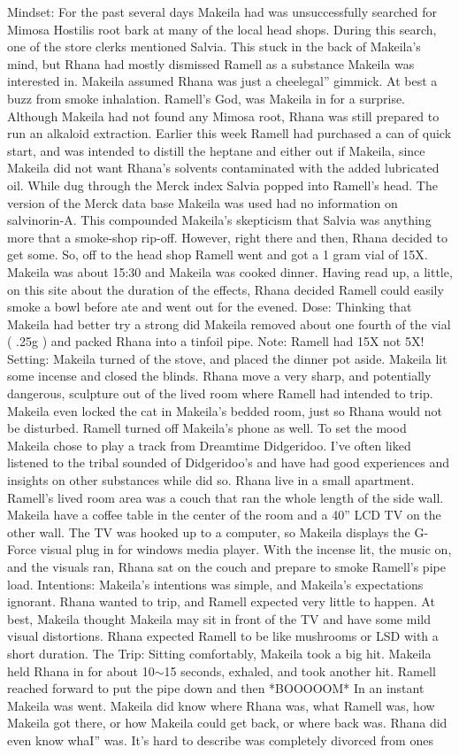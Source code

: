 \documentclass[12pt]{book}
\begin{document}
Mindset: For the past several days Makeila had was unsuccessfully searched for Mimosa Hostilis root bark at many of the local head shops. During this search, one of the store clerks mentioned Salvia. This stuck in the back of Makeila's mind, but Rhana had mostly dismissed Ramell as a substance Makeila was interested in. Makeila assumed Rhana was just a cheelegal'' gimmick. At best a buzz from smoke inhalation. Ramell's God, was Makeila in for a surprise. Although Makeila had not found any Mimosa root, Rhana was still prepared to run an alkaloid extraction. Earlier this week Ramell had purchased a can of quick start, and was intended to distill the heptane and either out if Makeila, since Makeila did not want Rhana's solvents contaminated with the added lubricated oil. While dug through the Merck index Salvia popped into Ramell's head. The version of the Merck data base Makeila was used had no information on salvinorin-A. This compounded Makeila's skepticism that Salvia was anything more that a smoke-shop rip-off. However, right there and then, Rhana decided to get some. So, off to the head shop Ramell went and got a 1 gram vial of 15X. Makeila was about 15:30 and Makeila was cooked dinner. Having read up, a little, on this site about the duration of the effects, Rhana decided Ramell could easily smoke a bowl before ate and went out for the evened. Dose: Thinking that Makeila had better try a strong did Makeila removed about one fourth of the vial ( .25g ) and packed Rhana into a tinfoil pipe. Note: Ramell had 15X not 5X! Setting: Makeila turned of the stove, and placed the dinner pot aside. Makeila lit some incense and closed the blinds. Rhana move a very sharp, and potentially dangerous, sculpture out of the lived room where Ramell had intended to trip. Makeila even locked the cat in Makeila's bedded room, just so Rhana would not be disturbed. Ramell turned off Makeila's phone as well. To set the mood Makeila chose to play a track from Dreamtime Didgeridoo. I've often liked listened to the tribal sounded of Didgeridoo's and have had good experiences and insights on other substances while did so. Rhana live in a small apartment. Ramell's lived room area was a couch that ran the whole length of the side wall. Makeila have a coffee table in the center of the room and a 40'' LCD TV on the other wall. The TV was hooked up to a computer, so Makeila displays the G-Force visual plug in for windows media player. With the incense lit, the music on, and the visuals ran, Rhana sat on the couch and prepare to smoke Ramell's pipe load. Intentions: Makeila's intentions was simple, and Makeila's expectations ignorant. Rhana wanted to trip, and Ramell expected very little to happen. At best, Makeila thought Makeila may sit in front of the TV and have some mild visual distortions. Rhana expected Ramell to be like mushrooms or LSD with a short duration. The Trip: Sitting comfortably, Makeila took a big hit. Makeila held Rhana in for about 10$\sim$15 seconds, exhaled, and took another hit. Ramell reached forward to put the pipe down and then *BOOOOOM* In an instant Makeila was went. Makeila did know where Rhana was, what Ramell was, how Makeila got there, or how Makeila could get back, or where back was. Rhana did even know whaI'' was. It's hard to describe was completely divorced from ones 
\end{document}
